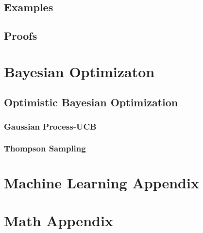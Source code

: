\documentclass[
  fourColumns,
  landscape
]{formularyETH/formularyETH}
\begin{document}
    \subsection{Examples}\label{subsec:examples}
    
    \subsection{Proofs}\label{subsec:proofs}
    
\newpage
   \section{Bayesian Optimizaton}\label{sec:bayesian_optimizaton}
    
    
    \subsection{Optimistic Bayesian Optimization}\label{subsec:optimistic_bayesian_optimization}
    
      \subsubsection{Gaussian Process-UCB}\label{subsubsec:gaussian_process-ucb}
        
      \subsubsection{Thompson Sampling}\label{subsubsec:thompson_sampling}
        









% 
\newpage  
\section*{Machine Learning Appendix}\label{sec:ml_appendix}
  
\newpage  
\section*{Math Appendix}\label{sec:math_appendix}

\end{document}
